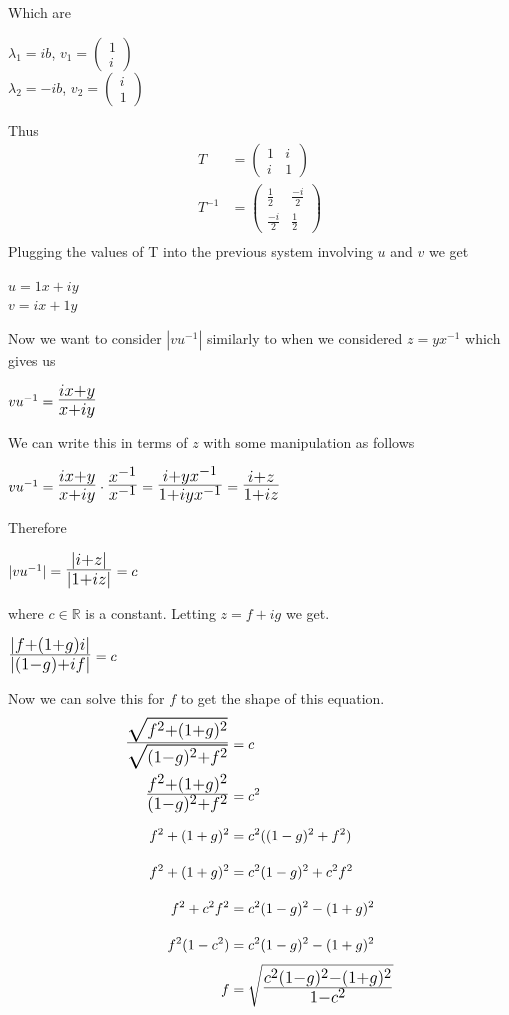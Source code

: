 \documentclass[10pt]{article}
\def\mathLarge#1{\mbox{\LARGE $#1$}}
\begin{document}
Which are
\begin{center}
$\lambda_{1} = ib$, $v_{1} = \begin{pmatrix}1\\i\end{pmatrix}$\\
$\lambda_{2} = -ib$, $v_{2} = \begin{pmatrix}i\\1\end{pmatrix}$\\
\end{center}
Thus
\begin{align*}
T &= \begin{pmatrix}1&i\\i&1\end{pmatrix}\\
T^{-1} &= \begin{pmatrix}\frac{1}{2}&\frac{-i}{2}\\[6pt]\frac{-i}{2}&\frac{1}{2}\end{pmatrix}\\
\end{align*}
Plugging the values of T into the previous system involving $u$ and $v$ we get
\begin{center}
$u = 1x + iy$\\
$v = ix + 1y$
\end{center}
Now we want to consider $|vu^{-1}|$ similarly to when we considered $z=yx^{-1}$ which gives us
\begin{center}
$vu^{-1} = \mathLarge{\frac{ix + y}{x + iy}}$
\end{center}
We can write this in terms of $z$ with some manipulation as follows
\begin{center}
$vu^{-1} = \mathLarge{\frac{ix + y}{x + iy}}\cdot\mathLarge{\frac{x^{-1}}{x^{-1}}}=
\mathLarge{\frac{i + yx^{-1}}{1 + iyx^{-1}}} = \mathLarge{\frac{i + z}{1 + iz}}$
\end{center}
Therefore
\begin{center}
$|vu^{-1}| = \mathLarge{\frac{|i + z|}{|1 + iz|}} = c$
\end{center}
where $c \in \mathbb R$ is a constant. Letting $z=f + ig$ we get.
\begin{center}
$\mathLarge{\frac{|f + (1+g)i|}{|(1-g) + if|}} = c$
\end{center}
Now we can solve this for $f$ to get the shape of this equation.
\begin{align*}
\mathLarge{\frac{\sqrt{f^{2} + (1+g)^{2}}}{\sqrt{(1-g)^{2} + f^{2}}}} &= c\\
\mathLarge{\frac{f^{2} + (1+g)^{2}}{(1-g)^{2} + f^{2}}} &= c^{2}\\
f^{2} + (1+g)^{2} &= c^{2}((1-g)^{2} + f^{2})\\
f^{2} + (1+g)^{2} &= c^{2}(1-g)^{2} + c^{2}f^{2}\\
f^{2} + c^{2}f^{2} &= c^{2}(1-g)^{2} - (1+g)^{2}\\
f^{2}(1-c^{2}) &= c^{2}(1-g)^{2} - (1+g)^{2}\\
f &= \mathLarge{\sqrt{\frac{c^{2}(1-g)^{2} - (1+g)^{2}}{1-c^{2}}}}
\end{align*}
\end{document}
